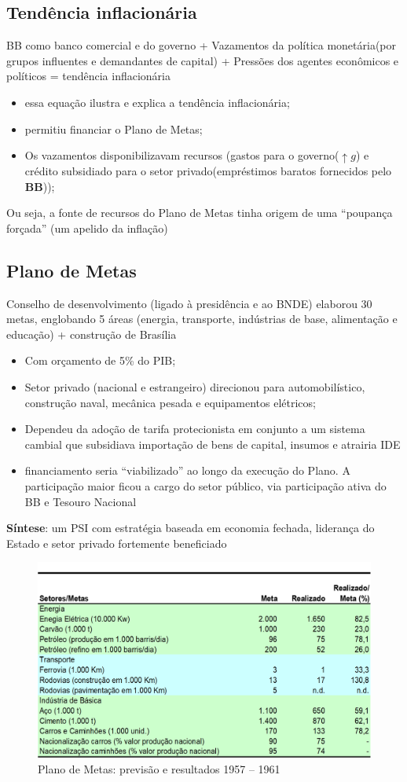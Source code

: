 \documentclass[a4paper,12pt]{article}[abntex2]
\begin{document}
\subsection{\textbf{Tendência inflacionária}}
BB como banco comercial e do governo + Vazamentos da política monetária(por grupos influentes e demandantes de capital) + Pressões dos agentes econômicos e políticos = tendência inflacionária\begin{itemize}
    \item essa equação ilustra e explica a tendência inflacionária;
    \item permitiu financiar o Plano de Metas;
    \item Os vazamentos disponibilizavam recursos (gastos para o governo($\uparrow g$) e  crédito subsidiado para o setor privado(empréstimos baratos fornecidos pelo \textbf{BB}));
\end{itemize}

Ou seja, a fonte de recursos do Plano de Metas tinha origem de uma “poupança forçada” (um apelido da inflação)


\subsection{\textbf{Plano de Metas}}

Conselho de desenvolvimento (ligado à presidência e ao BNDE) elaborou 30 metas, englobando 5 áreas (energia, transporte, indústrias de base, alimentação e educação) + construção de Brasília\begin{itemize}
    \item Com orçamento de 5\% do PIB;
    \item Setor privado (nacional e estrangeiro) direcionou para automobilístico, construção naval, mecânica pesada e equipamentos elétricos;
    \item Dependeu da adoção de tarifa protecionista em conjunto a um sistema cambial que subsidiava importação de bens de capital, insumos e atrairia IDE
    \item financiamento seria “viabilizado” ao longo da execução do Plano. A participação maior ficou a cargo do setor público, via participação ativa do BB e Tesouro Nacional
\end{itemize}

\textbf{Síntese}: um PSI com estratégia baseada em economia fechada, liderança do Estado e setor privado fortemente beneficiado


\begin{figure}[H]
    \centering
    \caption{Plano de Metas: previsão e resultados   1957 – 1961}
    \includegraphics[width=0.7\linewidth]{Imagens/a2i1.png}
\end{figure}
\end{document}
